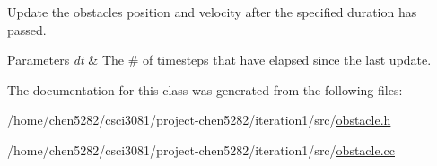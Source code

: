Update the obstacle\textquotesingle{}s position and velocity after the specified duration has passed. 


\begin{DoxyParams}{Parameters}
{\em dt} & The \# of timesteps that have elapsed since the last update. \\
\hline
\end{DoxyParams}


The documentation for this class was generated from the following files\+:\begin{DoxyCompactItemize}
\item 
/home/chen5282/csci3081/project-\/chen5282/iteration1/src/\hyperlink{obstacle_8h}{obstacle.\+h}\item 
/home/chen5282/csci3081/project-\/chen5282/iteration1/src/\hyperlink{obstacle_8cc}{obstacle.\+cc}\end{DoxyCompactItemize}
